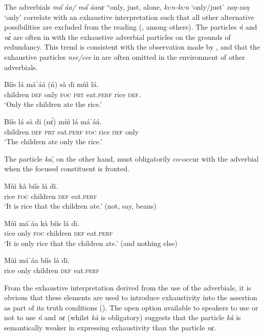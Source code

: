 \documentclass[output=paper
,newtxmath
,modfonts
,nonflat]{langsci/langscibook}
\begin{document}
The adverbials \textit{máˈáa/ máˈáanɛ} “only, just, alone, \textit{k$\upsilon $n-k$\upsilon $n} ‘only/just’ \textit{zaŋ-zaŋ} ‘only’ correlate with an exhaustive  interpretation such that all other alternative possibilities are excluded from the reading (\citealt[see][]{rooth1985,Rooth1992,krifka2006,vanderWal2013}, among others). The particles \textit{ń} and \textit{nɛ́} are often in  with the exhaustive adverbial particles on the grounds of redundancy. This trend is consistent with the observation made by \citet[256]{hartmann2007}, \citet[511]{jaggar2001} and \citet[190]{newman2000hausa} that the exhaustive particles \textit{nee/cee} in  are often omitted in the environment of other adverbials. 

 
\ea\label{ex:abubakari:27}
\gll Bíís    lá  máˈáá    (ń)  sà  dī mùì  lá.\\
children  \textsc{def}  only    \textsc{foc}  \textsc{prt}  eat.\textsc{perf}  rice  \textsc{def}.\\
\glt ‘Only the children ate the rice.’ 
\z 

 
\ea\label{ex:abubakari:28} 
\gll Bíís    lá  sà  dī    (nɛ́)  mùì  lá máˈáá.\\
children  \textsc{def}  \textsc{prt}  eat.\textsc{perf}  \textsc{foc}  rice   \textsc{def} only\\
\glt ‘The children ate only the rice.’ 
\z 

The particle \textit{ka\`{,}} on the other hand, must obligatorily co-occur with the adverbial when the focused constituent is fronted.

 
\ea\label{ex:abubakari:29} 
\gll Mùì  kà  bíís    lá  dī.\\
rice  \textsc{foc}  children  \textsc{def}  eat.\textsc{perf}\\
\glt ‘It is rice that the children ate.’ (not, say, beans)
\z
 
\ea\label{ex:abubakari:30} 
\gll Mùì  máˈáa    kà  bíís    lá  dī.\\
rice  only    \textsc{foc}  children  \textsc{def}  eat.\textsc{perf}\\
\glt ‘It is only rice that the children ate.’ (and nothing else)

\gll     *Mùì    máˈáa    bíís    lá  dī.\\
rice    only    children  \textsc{def}  eat.\textsc{perf}\\
\glt
\z

{From the exhaustive interpretation derived from the use of the adverbials, it is obvious that these elements are used to introduce exhaustivity into the assertion as part of its truth conditions (}\citealt{hartmann2007}). { The open option available to speakers to use or not to use} \textit{{ń}}{ and} \textit{{nɛ} }{(}{whilst} \textit{{kà}}{ is obligatory) suggests that the particle} \textit{{kà}}{ is semantically weaker in expressing exhaustivity than the particle} \textit{{nɛ.}}{} 
\end{document}
